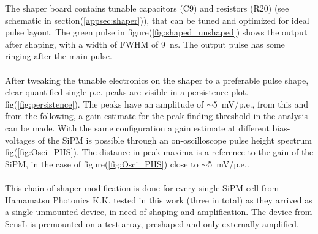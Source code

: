 \documentclass[12pt,article,type=msc,colorback,accentcolor=tud9c]{tudthesis}
\begin{document}
The shaper board contains tunable capacitors (C9) and resistors (R20) (see schematic in section(\ref{appsec:shaper})), that can be tuned and optimized for ideal pulse layout. The green pulse in figure(\ref{fig:shaped_unshaped}) shows the output after shaping, with a width of FWHM of 9~ns. The output pulse has some ringing after the main pulse.\\\\
After tweaking the tunable electronics on the shaper to a preferable pulse shape, clear quantified single p.e. peaks are visible in a persistence plot. fig(\ref{fig:persistence}). The peaks have an amplitude of $\sim$5~mV/p.e., from this and from the following, a gain estimate for the peak finding threshold in the analysis can be made. With the same configuration a gain estimate at different bias-voltages of the SiPM is possible through an on-oscilloscope pulse height spectrum fig(\ref{fig:Osci_PHS}). The distance in peak maxima is a reference to the gain of the SiPM, in the case of figure(\ref{fig:Osci_PHS}) close to $\sim$5~mV/p.e..\\\\
This chain of shaper modification is done for every single SiPM cell from Hamamatsu Photonics K.K. tested in this work (three in total) as they arrived as a single unmounted device, in need of shaping and amplification. The device from SensL is premounted on a test array, preshaped and only externally amplified.








\clearpage
\end{document}

